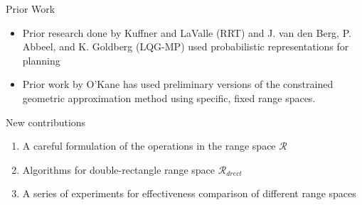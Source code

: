 \begin{frame}{Prior Work}
\begin{itemize}
\item Prior research done by Kuffner and LaValle (RRT) and J. van den Berg,
  P. Abbeel, and K. Goldberg (LQG-MP)
  used probabilistic representations for planning
\item Prior work by O'Kane has used preliminary versions of the
  constrained geometric approximation method using specific, fixed range spaces.
\end{itemize}
New contributions
\begin{enumerate}
\item A careful formulation of the operations in the range space $\mathcal{R}$
\item Algorithms for double-rectangle range space $\mathcal{R}_{drect}$
\item A series of experiments for effectiveness comparison of different range spaces
\end{enumerate}
\end{frame}


